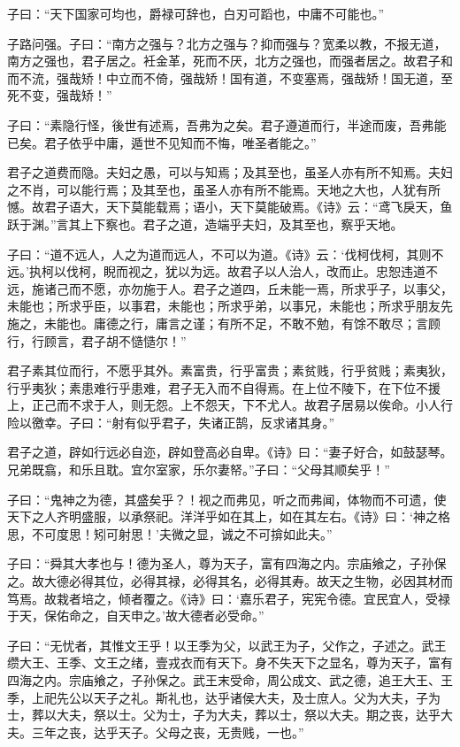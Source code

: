 子曰：“天下国家可均也，爵禄可辞也，白刃可蹈也，中庸不可能也。”

子路问强。子曰：“南方之强与？北方之强与？抑而强与？宽柔以教，不报无道，南方之强也，君子居之。衽金革，死而不厌，北方之强也，而强者居之。故君子和而不流，强哉矫！中立而不倚，强哉矫！国有道，不变塞焉，强哉矫！国无道，至死不变，强哉矫！”

子曰：“素隐行怪，後世有述焉，吾弗为之矣。君子遵道而行，半途而废，吾弗能已矣。君子依乎中庸，遁世不见知而不悔，唯圣者能之。”

君子之道费而隐。夫妇之愚，可以与知焉；及其至也，虽圣人亦有所不知焉。夫妇之不肖，可以能行焉；及其至也，虽圣人亦有所不能焉。天地之大也，人犹有所憾。故君子语大，天下莫能载焉；语小，天下莫能破焉。《诗》云：“鸢飞戾天，鱼跃于渊。”言其上下察也。君子之道，造端乎夫妇，及其至也，察乎天地。

子曰：“道不远人，人之为道而远人，不可以为道。《诗》云：‘伐柯伐柯，其则不远。’执柯以伐柯，睨而视之，犹以为远。故君子以人治人，改而止。忠恕违道不远，施诸己而不愿，亦勿施于人。君子之道四，丘未能一焉，所求乎子，以事父，未能也；所求乎臣，以事君，未能也；所求乎弟，以事兄，未能也；所求乎朋友先施之，未能也。庸德之行，庸言之谨；有所不足，不敢不勉，有馀不敢尽；言顾行，行顾言，君子胡不慥慥尔！”

君子素其位而行，不愿乎其外。素富贵，行乎富贵；素贫贱，行乎贫贱；素夷狄，行乎夷狄；素患难行乎患难，君子无入而不自得焉。在上位不陵下，在下位不援上，正己而不求于人，则无怨。上不怨天，下不尤人。故君子居易以俟命。小人行险以徼幸。子曰：“射有似乎君子，失诸正鹄，反求诸其身。”

君子之道，辟如行远必自迩，辟如登高必自卑。《诗》曰：“妻子好合，如鼓瑟琴。兄弟既翕，和乐且耽。宜尔室家，乐尔妻帑。”子曰：“父母其顺矣乎！”

子曰：“鬼神之为德，其盛矣乎？！视之而弗见，听之而弗闻，体物而不可遗，使天下之人齐明盛服，以承祭祀。洋洋乎如在其上，如在其左右。《诗》曰：‘神之格思，不可度思！矧可射思！’夫微之显，诚之不可揜如此夫。”

子曰：“舜其大孝也与！德为圣人，尊为天子，富有四海之内。宗庙飨之，子孙保之。故大德必得其位，必得其禄，必得其名，必得其寿。故天之生物，必因其材而笃焉。故栽者培之，倾者覆之。《诗》曰：‘嘉乐君子，宪宪令德。宜民宜人，受禄于天，保佑命之，自天申之。’故大德者必受命。”

子曰：“无忧者，其惟文王乎！以王季为父，以武王为子，父作之，子述之。武王缵大王、王季、文王之绪，壹戎衣而有天下。身不失天下之显名，尊为天子，富有四海之内。宗庙飨之，子孙保之。武王末受命，周公成文、武之德，追王大王、王季，上祀先公以天子之礼。斯礼也，达乎诸侯大夫，及士庶人。父为大夫，子为士，葬以大夫，祭以士。父为士，子为大夫，葬以士，祭以大夫。期之丧，达乎大夫。三年之丧，达乎天子。父母之丧，无贵贱，一也。”

